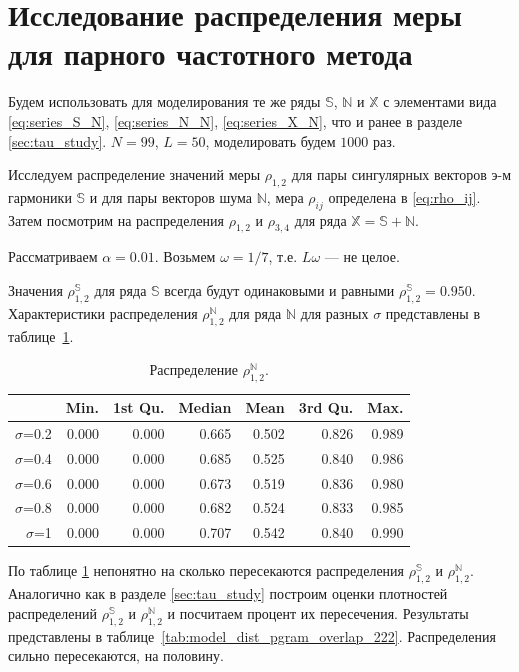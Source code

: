 \documentclass[specialist,
               substylefile = spbu.rtx,
               subf,href,colorlinks=true, 12pt]{disser}
\begin{document}
\section{Исследование распределения меры для парного частотного метода}
\label{sec:per_study}

Будем использовать для моделирования те же ряды $\mathbb{S}$, $\mathbb{N}$ и $\mathbb{X}$ с элементами вида
\eqref{eq:series_S_N}, \eqref{eq:series_N_N}, \eqref{eq:series_X_N}, что и ранее в разделе \ref{sec:tau_study}.
$N = 99$, $L = 50$, моделировать будем $1000$ раз.

Исследуем распределение значений  меры $\rho_{1,2}$ для пары сингулярных векторов э-м гармоники $\mathbb{S}$ и для пары векторов шума $\mathbb{N}$, мера $\rho_{ij}$ определена в \eqref{eq:rho_ij}. Затем посмотрим на распределения  $\rho_{1,2}$ и  $\rho_{3,4}$ для ряда $\mathbb{X} = \mathbb{S} + \mathbb{N}$.

Рассматриваем $\alpha = 0.01$. Возьмем $\omega = 1/7$, т.е. $L\omega$ --- не целое.

Значения $\rho^{\mathbb{S}}_{1,2}$  для ряда $\mathbb{S}$ всегда будут одинаковыми и равными  $\rho^{\mathbb{S}}_{1,2} = 0.950$. Характеристики распределения $\rho^{\mathbb{N}}_{1,2}$ для ряда $\mathbb{N}$ для разных $\sigma$ представлены в таблице~\ref{tab:model_dist_pgram_sig2}.

\begin{table}[hhh!]
\caption{Распределение $\rho^{\mathbb{N}}_{1,2}$.}
\centering
\begin{tabular}{rrrrrrr}
  \hline
 & Min. & 1st Qu. & Median & Mean & 3rd Qu. & Max. \\
  \hline
$\sigma$=0.2 & 0.000 & 0.000 & 0.665 & 0.502 & 0.826 & 0.989 \\
  $\sigma$=0.4 & 0.000 & 0.000 & 0.685 & 0.525 & 0.840 & 0.986 \\
  $\sigma$=0.6 & 0.000 & 0.000 & 0.673 & 0.519 & 0.836 & 0.980 \\
  $\sigma$=0.8 & 0.000 & 0.000 & 0.682 & 0.524 & 0.833 & 0.985 \\
  $\sigma$=1 & 0.000 & 0.000 & 0.707 & 0.542 & 0.840 & 0.990 \\
   \hline
\end{tabular}
\label{tab:model_dist_pgram_sig2}
\end{table}

По таблице \ref{tab:model_dist_pgram_sig2} непонятно на сколько пересекаются распределения $\rho^{\mathbb{S}}_{1,2}$ и $\rho^{\mathbb{N}}_{1,2}$.
Аналогично как в разделе \ref{sec:tau_study} построим оценки плотностей распределений $\rho^{\mathbb{S}}_{1,2}$ и  $\rho^{\mathbb{N}}_{1,2}$ и посчитаем процент их пересечения.
Результаты представлены в таблице~\ref{tab:model_dist_pgram_overlap_222}. Распределения сильно пересекаются, на половину.
\end{document}

